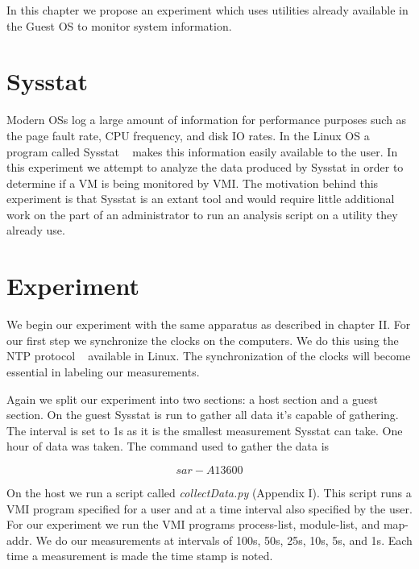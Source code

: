 
In this chapter we propose an experiment which uses utilities already available in the
Guest OS to monitor system information. 

\section{Sysstat}

Modern OSs log a large amount of information for performance purposes such as the page fault rate, CPU frequency, and disk IO rates. In the Linux OS a program called Sysstat ~\cite{godard_sysstat_2010} makes this information easily available to the user. In this experiment we attempt to analyze the data produced by Sysstat in order to determine if a VM is being monitored by VMI. The motivation behind this experiment is that Sysstat is an extant tool and would require little additional work on the part of an administrator to run an analysis script on a utility they already use. 

\section{Experiment}

We begin our experiment with the same apparatus as described in chapter II. For our first step we synchronize the clocks on the computers. We do this using the NTP protocol ~\cite{mills_internet_1991} available in Linux. The synchronization of the clocks will become essential in labeling our measurements.

Again we split our experiment into two sections: a host section and a guest section. On the guest Sysstat is run to gather all data it's capable of gathering. The interval is set to 1s as it is the smallest measurement Sysstat can take. One hour of data was taken. The command used to gather the data is 

\begin{center}
\begin{equation}\label{SAR}
	sar -A 1 3600
\end{equation}
\end{center}

On the host we run a script called \textit{collectData.py} (Appendix I). This script runs a VMI program specified for a user and at a time interval also specified by the user. For our experiment we run the VMI programs process-list, module-list, and map-addr. We do our measurements at intervals of 100s, 50s, 25s, 10s, 5s, and 1s. Each time a measurement is made the time stamp is noted.

